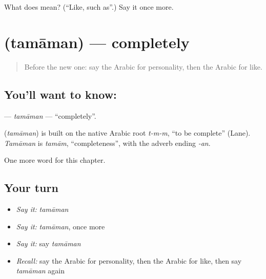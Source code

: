 \begin{tcolorbox}[breakable,colback=teal!4,colframe=teal!35!black,title={Before you move on}]
What does  mean? (\textquotedblleft{}Like, such as\textquotedblright{}.) Say it once more.
\end{tcolorbox}
\section[\texorpdfstring{\ar{تماما} (tamāman)}{تماما (tamāman)}]{ (tamāman) — completely}

\label{lesson:AR-C238-tamaman}



\begin{quote}
Before the new one: say the Arabic for personality, then the Arabic for like.
\end{quote}

\subsection*{You'll want to know: }
\textbf{} — \emph{tamāman} — \textquotedblleft{}completely\textquotedblright{}.

\begin{cousinweb}
\textbf{} (\emph{tamāman}) is built on the native Arabic root \emph{t-m-m}, \textquotedblleft{}to be complete\textquotedblright{} (Lane). \emph{Tamāman} is \emph{tamām}, \textquotedblleft{}completeness\textquotedblright{}, with the adverb ending \emph{-an}.
\end{cousinweb}

\begin{grammarlens}[title={What you've built}]
One more word for this chapter.
\end{grammarlens}

\subsection*{Your turn}
\begin{itemize}
\raggedright
  \item \emph{Say it:} \emph{tamāman}
  \item \emph{Say it:} \emph{tamāman}, once more
  \item \emph{Say it:} say \emph{tamāman}
  \item \emph{Recall:} say the Arabic for personality, then the Arabic for like, then say \emph{tamāman} again
\end{itemize}

